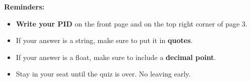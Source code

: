 \documentclass[twoside,12pt]{article}
\begin{document}
\newpage

\begin{center}
\textbf{Reminders:}
\begin{itemize}
    \item \textbf{Write your PID} on the front page and on the top right corner of page 3.
    \item If your answer is a string, make sure to put it in \textbf{quotes}.
    \item If your answer is a float, make sure to include a \textbf{decimal point}.
    \item Stay in your seat until the quiz is over. No leaving early.
\end{itemize}
\end{center}
\end{document}
